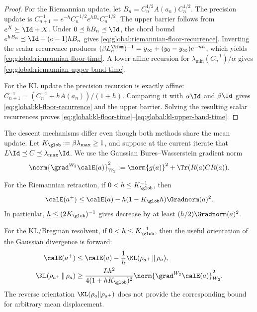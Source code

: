 \begin{proof}
For the Riemannian update, let \(B_n=C_n^{1/2}A(a_n)C_n^{1/2}\).  The precision update is
\(
C_{n+1}^{-1}=e^{-h}C_n^{-1/2}e^{hB_n}C_n^{-1/2}
\).  The upper barrier follows from \(e^X\succeq\Id+X\).  Under
\(0\preceq hB_n\preceq\Id\), the chord bound
\(e^{hB_n}\preceq\Id+(e-1)hB_n\) gives
\eqref{eq:global:riemannian-floor-recurrence}.  Inverting the scalar recurrence produces
\(
(\beta L_n^{\Riem})^{-1}
=y_\infty+(y_0-y_\infty)e^{-nh}
\), which yields \eqref{eq:global:riemannian-floor-time}.  A lower affine recursion for
\(\lambda_{\min}(C_n^{-1})/\alpha\) gives
\eqref{eq:global:riemannian-upper-band-time}.

For the KL update the precision recursion is exactly affine:
\(
C_{n+1}^{-1}=(C_n^{-1}+hA(a_n))/(1+h)
\).  Comparing it with \(\alpha\Id\) and \(\beta\Id\) gives
\eqref{eq:global:kl-floor-recurrence} and the upper barrier.  Solving the resulting scalar
recurrences proves \eqref{eq:global:kl-floor-time}--\eqref{eq:global:kl-upper-band-time}.
\end{proof}

The descent mechanisms differ even though both methods share the mean update.  Let
\(
K_{\glob}:=\beta\lambda_{\max}\geq1
\), and suppose at the current iterate that
\(L\Id\preceq C\preceq\lambda_{\max}\Id\).  We use the Gaussian
Bures--Wasserstein gradient norm
\begin{equation}
\label{eq:global:wasserstein-gradient-norm}
    \norm{\grad^{W_2}\calE(a)}_{W_2}^2
    :=\norm{g(a)}^2+\Tr(R(a)C R(a)).
\end{equation}

\begin{proposition}
\label{prop:global:one-step-descent}
For the Riemannian retraction, if \(0<h\leq K_{\glob}^{-1}\), then
\begin{equation}
\label{eq:global:riemannian-descent}
    \calE(a^+)
    \leq\calE(a)-h(1-K_{\glob}h)\Gradnorm(a)^2.
\end{equation}
In particular, \(h\leq(2K_{\glob})^{-1}\) gives decrease by at least
\((h/2)\Gradnorm(a)^2\).

For the KL/Bregman resolvent, if \(0<h\leq K_{\glob}^{-1}\), then the useful orientation of the
Gaussian divergence is forward:
\begin{align}
\label{eq:global:kl-forward-descent}
    \calE(a^+)
    &\leq\calE(a)-\frac1h\KL(\rho_{a^+}\,\|\,\rho_a),\\
\label{eq:global:kl-forward-control}
    \KL(\rho_{a^+}\,\|\,\rho_a)
    &\geq
    \frac{Lh^2}{4(1+hK_{\glob})^2}
    \norm{\grad^{W_2}\calE(a)}_{W_2}^2.
\end{align}
The reverse orientation \(\KL(\rho_a\|\rho_{a^+})\) does not provide the corresponding bound for
arbitrary mean displacement.
\end{proposition}

